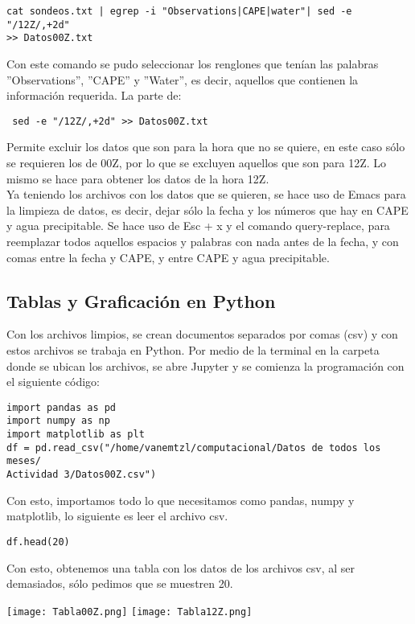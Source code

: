 \documentclass[12pt]{article}
\begin{document}
\begin{doublespace}
\begin{verbatim}
cat sondeos.txt | egrep -i "Observations|CAPE|water"| sed -e "/12Z/,+2d" 
>> Datos00Z.txt
\end{verbatim}

Con este comando se pudo seleccionar los renglones que tenían las palabras ''Observations'', ''CAPE'' y ''Water'', es decir, aquellos que contienen la información requerida. La parte de:
\begin{verbatim} sed -e "/12Z/,+2d" >> Datos00Z.txt \end{verbatim} 
Permite excluir los datos que son para la hora que no se quiere, en este caso sólo se requieren los de 00Z, por lo que se excluyen aquellos que son para 12Z. Lo mismo se hace para obtener los datos de la hora 12Z.
\\

Ya teniendo los archivos con los datos que se quieren, se hace uso de Emacs para la limpieza de datos, es decir, dejar sólo la fecha y los números que hay en CAPE y agua precipitable. Se hace uso de Esc + x y el comando query-replace, para reemplazar todos aquellos espacios y palabras con nada antes de la fecha, y con comas entre la fecha y CAPE, y entre CAPE y agua precipitable.

\subsection{Tablas y Graficación en Python}
Con los archivos limpios, se crean documentos separados por comas (csv) y con estos archivos se trabaja en Python. Por medio de la terminal en la carpeta donde se ubican los archivos, se abre Jupyter y se comienza la programación con el siguiente código:
\begin{verbatim}
import pandas as pd
import numpy as np
import matplotlib as plt
df = pd.read_csv("/home/vanemtzl/computacional/Datos de todos los meses/
Actividad 3/Datos00Z.csv")
\end{verbatim}
Con esto, importamos todo lo que necesitamos como pandas, numpy y matplotlib, lo siguiente es leer el archivo csv.

\begin{verbatim}
df.head(20)
\end{verbatim}
Con esto, obtenemos una tabla con los datos de los archivos csv, al ser demasiados, sólo pedimos que se muestren 20.
\\

\begin{center}
\texttt{[image: Tabla00Z.png]} \texttt{[image: Tabla12Z.png]}
\\


\end{center}
\end{doublespace}
\end{document}
